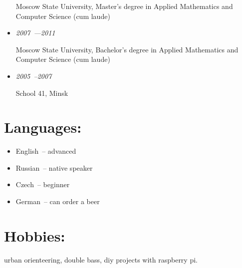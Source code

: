 \documentclass{res}
\begin{document}
\begin{resume}
\begin{itemize}
              Moscow State University, Master's degree in Applied Mathematics and Computer Science (cum laude)

            \item \textit{2007~---2011}

              Moscow State University, Bachelor's degree in Applied Mathematics and Computer Science (cum laude)

            \item \textit{2005~--2007}

             School 41, Minsk
        \end{itemize}

    \section{Languages:}
        \begin{itemize}
            \item English~-- advanced
            \item Russian~-- native speaker
            \item Czech~-- beginner
            \item German~-- can order a beer
        \end{itemize}


    \section{Hobbies:} urban orienteering, double bass, diy projects with raspberry pi.
\end{resume}
\end{document}

